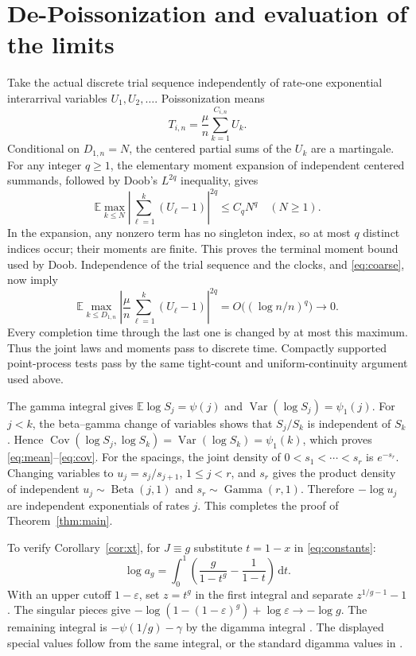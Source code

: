 \documentclass[11pt]{article}
\theoremstyle{remark}\newtheorem{remark}[theorem]{Remark}
\newcommand{\Ebb}{\mathbb E}
\newcommand{\Var}{\operatorname{Var}}
\newcommand{\Cov}{\operatorname{Cov}}
\newcommand{\dd}{\,\mathrm d}
\begin{document}
\section{De-Poissonization and evaluation of the limits}
Take the actual discrete trial sequence independently of rate-one
exponential interarrival variables $U_1,U_2,\ldots$. Poissonization means
\[
 T_{i,n}=\frac\mu n\sum_{k=1}^{C_{i,n}}U_k.
\]
Conditional on $D_{1,n}=N$, the centered partial sums of the $U_k$ are a
martingale. For any integer $q\ge1$, the elementary moment expansion of
independent centered summands, followed by Doob's $L^{2q}$ inequality, gives
\[
 \Ebb\max_{k\le N}\left|\sum_{\ell=1}^k(U_\ell-1)\right|^{2q}
 \le C_q N^q\quad(N\ge1).
\]
In the expansion, any nonzero term has no singleton index, so at most $q$
distinct indices occur; their moments are finite. This proves the terminal
moment bound used by Doob. Independence of the trial sequence and the clocks,
and \eqref{eq:coarse}, now imply
\begin{equation}\label{eq:depois}
 \Ebb\max_{k\le D_{1,n}}
 \left|\frac\mu n\sum_{\ell=1}^k(U_\ell-1)\right|^{2q}
 =O\bigl((\log n/n)^q\bigr)\longrightarrow0.
\end{equation}
Every completion time through the last one is changed by at most this
maximum. Thus the joint laws and moments pass to discrete time. Compactly
supported point-process tests pass by the same tight-count and
uniform-continuity argument used above.

The gamma integral gives
$\Ebb\log S_j=\psi(j)$ and $\Var(\log S_j)=\psi_1(j)$.
For $j<k$, the beta--gamma change of variables shows that $S_j/S_k$ is
independent of $S_k$. Hence
$\Cov(\log S_j,\log S_k)=\Var(\log S_k)=\psi_1(k)$,
which proves \eqref{eq:mean}--\eqref{eq:cov}.
For the spacings, the joint density of
$0<s_1<\cdots<s_r$ is $e^{-s_r}$. Changing variables to
$u_j=s_j/s_{j+1}$, $1\le j<r$, and $s_r$ gives the product density of
independent $u_j\sim\operatorname{Beta}(j,1)$ and
$s_r\sim\operatorname{Gamma}(r,1)$. Therefore $-\log u_j$ are independent
exponentials of rates $j$. This completes the proof of
Theorem~\ref{thm:main}.

To verify Corollary~\ref{cor:xt}, for $J\equiv g$ substitute $t=1-x$ in
\eqref{eq:constants}:
\[
 \log a_g=\int_0^1\left(\frac g{1-t^g}-\frac1{1-t}\right)\dd t.
\]
With an upper cutoff $1-\varepsilon$, set $z=t^g$ in the first integral and
separate $z^{1/g-1}-1$. The singular pieces give
$-\log(1-(1-\varepsilon)^g)+\log\varepsilon\to-\log g$.
The remaining integral is $-\psi(1/g)-\gamma$ by the digamma integral
\cite[\S5.9.16]{DLMF}. The displayed special values follow from the same
integral, or the standard digamma values in \cite[\S5.4]{DLMF}.
\end{document}
